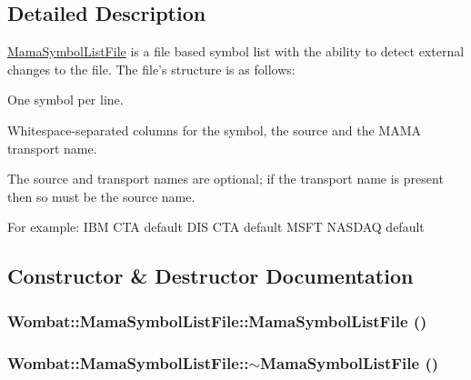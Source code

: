 \subsection{Detailed Description}
\hyperlink{classWombat_1_1MamaSymbolListFile}{MamaSymbolListFile} is a file based symbol list with the ability to detect external changes to the file. The file's structure is as follows:
\begin{DoxyItemize}
\item One symbol per line.
\item Whitespace-\/separated columns for the symbol, the source and the MAMA transport name.
\item The source and transport names are optional; if the transport name is present then so must be the source name.
\end{DoxyItemize}

For example: IBM CTA default DIS CTA default MSFT NASDAQ default 

\subsection{Constructor \& Destructor Documentation}
\hypertarget{classWombat_1_1MamaSymbolListFile_aa4ad63a7c2721d11bb28bfb93aea6ff8}{
\subsubsection[{MamaSymbolListFile}]{\setlength{\rightskip}{0pt plus 5cm}Wombat::MamaSymbolListFile::MamaSymbolListFile ()}}
\label{classWombat_1_1MamaSymbolListFile_aa4ad63a7c2721d11bb28bfb93aea6ff8}
\hypertarget{classWombat_1_1MamaSymbolListFile_a6aaa6eee9c2f3602c8de355a09939323}{
\subsubsection[{$\sim$MamaSymbolListFile}]{\setlength{\rightskip}{0pt plus 5cm}Wombat::MamaSymbolListFile::$\sim$MamaSymbolListFile ()}}
\label{classWombat_1_1MamaSymbolListFile_a6aaa6eee9c2f3602c8de355a09939323}


